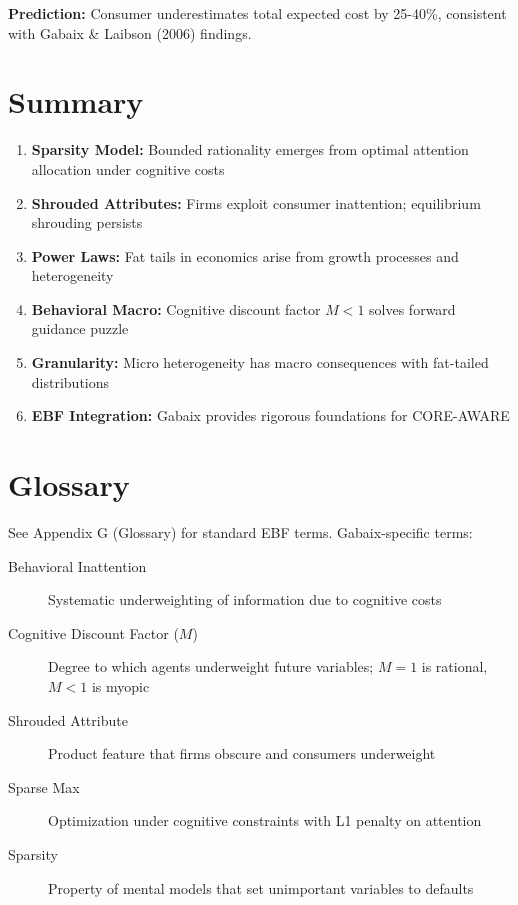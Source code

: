 \textbf{Prediction:} Consumer underestimates total expected cost by 25-40\%, consistent with Gabaix \& Laibson (2006) findings.

\section{Summary}

\begin{tcolorbox}[colback=gray!10!white, colframe=gray!75!black, title=Key Takeaways]
\begin{enumerate}
    \item \textbf{Sparsity Model:} Bounded rationality emerges from optimal attention allocation under cognitive costs
    \item \textbf{Shrouded Attributes:} Firms exploit consumer inattention; equilibrium shrouding persists
    \item \textbf{Power Laws:} Fat tails in economics arise from growth processes and heterogeneity
    \item \textbf{Behavioral Macro:} Cognitive discount factor $M < 1$ solves forward guidance puzzle
    \item \textbf{Granularity:} Micro heterogeneity has macro consequences with fat-tailed distributions
    \item \textbf{EBF Integration:} Gabaix provides rigorous foundations for CORE-AWARE
\end{enumerate}
\end{tcolorbox}

\section{Glossary}

See Appendix G (Glossary) for standard EBF terms. Gabaix-specific terms:

\begin{description}
    \item[Behavioral Inattention] Systematic underweighting of information due to cognitive costs
    \item[Cognitive Discount Factor ($M$)] Degree to which agents underweight future variables; $M=1$ is rational, $M<1$ is myopic
    \item[Shrouded Attribute] Product feature that firms obscure and consumers underweight
    \item[Sparse Max] Optimization under cognitive constraints with L1 penalty on attention
    \item[Sparsity] Property of mental models that set unimportant variables to defaults
\end{description}

